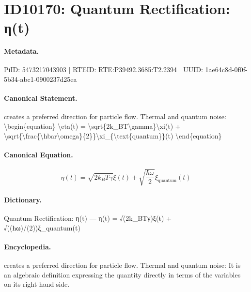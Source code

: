 \section*{ID10170: Quantum Rectification: η(t)}
\paragraph{Metadata.}
PiID: 5473217043903 | RTEID: RTE:P39492.3685:T2.2394 | UUID: 1ae64c8d-0f0f-5b34-abc1-0900237d25ea

\paragraph{Canonical Statement.}
creates a preferred direction for particle flow. Thermal and quantum noise: \textbackslash{}begin\{equation\} \textbackslash{}eta(t) = \textbackslash{}sqrt\{2k\_BT\textbackslash{}gamma\}\textbackslash{}xi(t) + \textbackslash{}sqrt\{\textbackslash{}frac\{\textbackslash{}hbar\textbackslash{}omega\}\{2\}\}\textbackslash{}xi\_\{\textbackslash{}text\{quantum\}\}(t) \textbackslash{}end\{equation\}

\paragraph{Canonical Equation.}
\[
\eta(t) = \sqrt{2k_BT\gamma}\xi(t) + \sqrt{\frac{\hbar\omega}{2}}\xi_{\text{quantum}}(t)
\]

\paragraph{Dictionary.}
Quantum Rectification: η(t) — η(t) = √(2k\_BTγ)ξ(t) + √((ħω)/(2))ξ\_quantum(t)

\paragraph{Encyclopedia.}
creates a preferred direction for particle flow. Thermal and quantum noise: It is an algebraic definition expressing the quantity directly in terms of the variables on its right-hand side.
